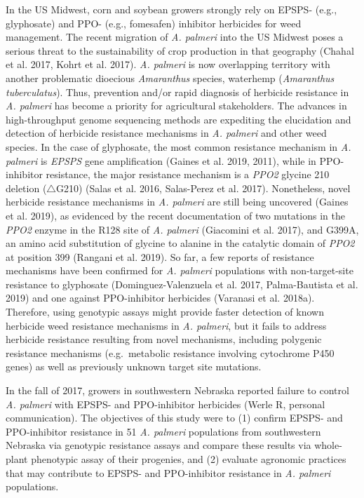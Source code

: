 \documentclass[
  12pt,
  a4paper]{article}
\begin{document}
In the US Midwest, corn and soybean growers strongly rely on EPSPS-
(e.g., glyphosate) and PPO- (e.g., fomesafen) inhibitor herbicides for
weed management. The recent migration of \emph{A. palmeri} into the US
Midwest poses a serious threat to the sustainability of crop production
in that geography (Chahal et al. 2017, Kohrt et al. 2017). \emph{A.
palmeri} is now overlapping territory with another problematic dioecious
\emph{Amaranthus} species, waterhemp (\emph{Amaranthus tuberculatus}).
Thus, prevention and/or rapid diagnosis of herbicide resistance in
\emph{A. palmeri} has become a priority for agricultural stakeholders.
The advances in high-throughput genome sequencing methods are expediting
the elucidation and detection of herbicide resistance mechanisms in
\emph{A. palmeri} and other weed species. In the case of glyphosate, the
most common resistance mechanism in \emph{A. palmeri} is \emph{EPSPS}
gene amplification (Gaines et al. 2019, 2011), while in PPO-inhibitor
resistance, the major resistance mechanism is a \emph{PPO2} glycine 210
deletion (\(\triangle\)G210) (Salas et al. 2016, Salas-Perez et al.
2017). Nonetheless, novel herbicide resistance mechanisms in \emph{A.
palmeri} are still being uncovered (Gaines et al. 2019), as evidenced by
the recent documentation of two mutations in the \emph{PPO2} enzyme in
the R128 site of \emph{A. palmeri} (Giacomini et al. 2017), and G399A,
an amino acid substitution of glycine to alanine in the catalytic domain
of \emph{PPO2} at position 399 (Rangani et al. 2019). So far, a few
reports of resistance mechanisms have been confirmed for \emph{A.
palmeri} populations with non-target-site resistance to glyphosate
(Dominguez-Valenzuela et al. 2017, Palma-Bautista et al. 2019) and one
against PPO-inhibitor herbicides (Varanasi et al. 2018a). Therefore,
using genotypic assays might provide faster detection of known herbicide
weed resistance mechanisms in \emph{A. palmeri}, but it fails to address
herbicide resistance resulting from novel mechanisms, including
polygenic resistance mechanisms (e.g.~metabolic resistance involving
cytochrome P450 genes) as well as previously unknown target site
mutations.

In the fall of 2017, growers in southwestern Nebraska reported failure
to control \emph{A. palmeri} with EPSPS- and PPO-inhibitor herbicides
(Werle R, personal communication). The objectives of this study were to
(1) confirm EPSPS- and PPO-inhibitor resistance in 51 \emph{A. palmeri}
populations from southwestern Nebraska via genotypic resistance assays
and compare these results via whole-plant phenotypic assay of their
progenies, and (2) evaluate agronomic practices that may contribute to
EPSPS- and PPO-inhibitor resistance in \emph{A. palmeri} populations.
\end{document}
